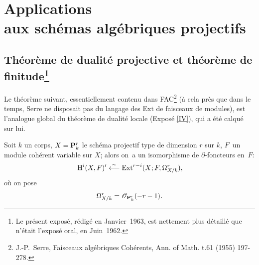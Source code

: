\chapter[Applications aux sch\'emas alg\'ebriques projectifs]
{Applications\\ aux sch\'emas alg\'ebriques projectifs} \label{XII}

\renewcommand{\theequation}{\arabic{equation}}

\section[Th\'eor\`eme de dualit\'e projective et th\'eor\`eme de finitude]
{Th\'eor\`eme de dualit\'e projective et th\'eor\`eme de finitude\footnote{Le pr\'esent expos\'e, r\'edig\'e en Janvier~1963, est nettement plus d\'etaill\'e que n'\'etait l'expos\'e oral, en Juin~1962.}}\label{XII.1}

Le th\'eor\`eme suivant, essentiellement contenu dans FAC\footnote{J.-P.~Serre, Faisceaux alg\'ebriques Coh\'erents, Ann. of Math. t.61 (1955) 197-278.} (\`a cela pr\`es que dans le temps, Serre ne disposait pas du langage des Ext de faisceaux de modules), est l'analogue global du th\'eor\`eme de dualit\'e locale (Expos\'e \ref{IV}), qui a \'et\'e calqu\'e sur lui.

\begin{theoreme} \label{XII.1.1}
Soit $k$ un corps, $X={\mathbf P}_k^r$ le sch\'ema projectif type de dimension $r$ sur $k$, $F$~un module coh\'erent variable sur $X$; alors on~a un isomorphisme de $\partial$-foncteurs en~$F$:
\steco
\begin{equation} \label{eq:XII.1} {}\operatorname{H}^i(X, F)' \overset{\sim}{\longleftarrow} \operatorname{Ext}^{r-i}(X;F, \Omega_{X/k}^r),
\end{equation}
o\`u on pose
\steco
\begin{equation} \label{eq:XII.2} {}\Omega_{X/k}^r= {\mathscr O}_{{\mathbf P}_k^r}(-r-1).
\end{equation}
\end{theoreme}

